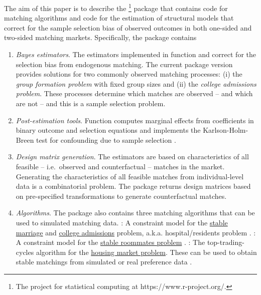 The aim of this paper is to describe the \footnote{The  project for statistical computing \citep{RCoreTeam2014} at https://www.r-project.org/.} package  \citep{Klein2015b} that contains  code for matching algorithms and  code for the estimation of structural models that correct for the sample selection bias of observed outcomes in both one-sided and two-sided matching markets. 
Specifically, the  package contains
\begin{enumerate}
\item \textit{Bayes estimators}. The estimators implemented in function  and  correct for the selection bias from endogenous matching. The current package version provides solutions for two commonly observed matching processes: 
(i) the \textit{group formation problem} with fixed group sizes and
(ii) the \textit{college admissions problem}.
These processes determine which matches are observed -- and which are not -- and this is a sample selection problem.

\item \textit{Post-estimation tools}. Function  computes marginal effects from coefficients in binary outcome and selection equations and  implements the Karlson-Holm-Breen test for confounding due to sample selection \citep{Karlson2012}.

\item \textit{Design matrix generation}. The estimators are based on characteristics of all feasible -- i.e.\ observed and counterfactual -- matches in the market. Generating the characteristics of all feasible matches from individual-level data is a combinatorial problem. The package returns design matrices based on pre-specified transformations to generate counterfactual matches.

\item \textit{Algorithms}. The package also contains three matching algorithms that can be used to simulated matching data. : A constraint model \citep{Prosser2014} for the \href{https://en.wikipedia.org/wiki/Stable_marriage_problem}{stable marriage} and \href{https://en.wikipedia.org/wiki/Hospital_resident}{college admissions} problem, a.k.a. hospital/residents problem \citep[see][]{Gale1962}. : A constraint model for the \href{https://en.wikipedia.org/wiki/Stable_roommates_problem}{stable roommates problem} \citep[see][]{Gusfield1989}. : The top-trading-cycles algorithm for the \href{https://en.wikipedia.org/wiki/Top_trading_cycle}{housing market problem}. These can be used to obtain stable matchings from simulated or real preference data \citep[see][]{Shapley1974}. 


\end{enumerate}
